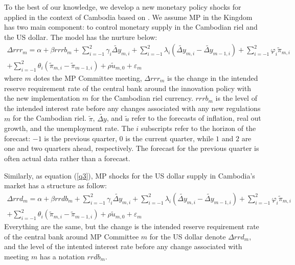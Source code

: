 \documentclass[11pt,letterpaper]{article}
\begin{document}
To the best of our knowledge, we develop a new monetary policy shocks for applied in the context of Cambodia based on \citet{Romer2004}. We assume MP in the Kingdom has two main component: to control monetary supply in the Cambodian riel and the US dollar. The model has the nurture below: 
\begin{equation}\begin{split}\label{q3}
		\Delta rrr_{m} = \alpha + \beta rrrb_{m} + \sum_{i = -1}^{2}{\gamma_{i} \widetilde{\Delta y}_{m,i}} + \sum_{i = -1}^{2} \lambda_{i} (\widetilde{\Delta y}_{m,i} - \widetilde{\Delta y}_{m-1, i}) + \sum_{i = -1}^{2} \varphi_{i}\widetilde{\pi}_{m,i} \\
		+ \sum_{i = -1}^{2}\theta_{i}(\widetilde\pi_{m,i} - \widetilde\pi_{m-1, i}) + \rho \widetilde{u}_{m,0} + \varepsilon_{m}
\end{split}\end{equation}
 where $m$ dotes the MP Committee meeting, $\Delta rrr_{m}$ is the change in the intended reserve requirement rate of the central bank around the innovation policy with the new implementation $m$ for the Cambodian riel currency. $rrrb_{m}$ is the level of the intended interest rate before any changes associated with any new regulations $m$ for the Cambodian riel. $\widetilde{\pi}$, $\widetilde{\Delta y}$, and $\widetilde{u}$ refer to the forecasts of inflation, real out growth, and the unemployment rate. The $i$ subscripts refer to the horizon of the forecast: $-1$ is the previous quarter, $0$ is the current quarter, while $1$ and $2$ are one and two quarters ahead, respectively. The forecast for the previous quarter is often actual data rather than a forecast.  
 
 Similarly, as equation (\ref{q3}), MP shocks for the US dollar supply in Cambodia's market has a structure as follow: 
\begin{equation}\begin{split}\label{q4}
		\Delta rrd_{m} = \alpha + \beta rrdb_{m} + \sum_{i = -1}^{2}{\gamma_{i} \widetilde{\Delta y}_{m,i}} + \sum_{i = -1}^{2} \lambda_{i} (\widetilde{\Delta y}_{m,i} - \widetilde{\Delta y}_{m-1, i}) + \sum_{i = -1}^{2} \varphi_{i}\widetilde{\pi}_{m,i} \\
		+ \sum_{i = -1}^{2}\theta_{i}(\widetilde\pi_{m,i} - \widetilde\pi_{m-1, i}) + \rho \widetilde{u}_{m,0} + \varepsilon_{m}
\end{split}\end{equation}
Everything are the same, but the change is the intended reserve requirement rate of the central bank around MP Committee $m$ for the US dollar denote $\Delta rrd_{m}$, and the level of the intented interest rate before any change associated with meeting $m$ has a notation $rrdb_{m}$.  
\end{document}
